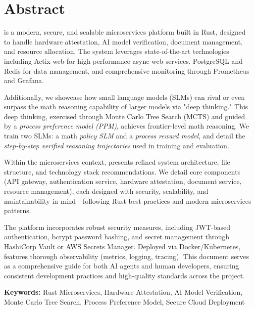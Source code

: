 \section*{Abstract}

\sysname{} is a modern, secure, and scalable microservices platform built in Rust, designed to handle hardware attestation, AI model verification, document management, and resource allocation. The system leverages state-of-the-art technologies including Actix-web for high-performance async web services, PostgreSQL and Redis for data management, and comprehensive monitoring through Prometheus and Grafana.

Additionally, we showcase how small language models (SLMs) can rival or even surpass the math reasoning capability of larger models via "deep thinking." This deep thinking, exercised through Monte Carlo Tree Search (MCTS) and guided by a \textit{process preference model (PPM)}, achieves frontier-level math reasoning. We train two SLMs: a math \emph{policy SLM} and a \emph{process reward model}, and detail the \textit{step-by-step verified reasoning trajectories} used in training and evaluation.

Within the microservices context, \sysname{} presents refined system architecture, file structure, and technology stack recommendations. We detail core components (API gateway, authentication service, hardware attestation, document service, resource management), each designed with security, scalability, and maintainability in mind—following Rust best practices and modern microservices patterns.

The platform incorporates robust security measures, including JWT-based authentication, bcrypt password hashing, and secret management through HashiCorp Vault or AWS Secrets Manager. Deployed via Docker/Kubernetes, \sysname{} features thorough observability (metrics, logging, tracing). This document serves as a comprehensive guide for both AI agents and human developers, ensuring consistent development practices and high-quality standards across the project.

\medskip
\noindent \textbf{Keywords:} Rust Microservices, Hardware Attestation, AI Model Verification, Monte Carlo Tree Search, Process Preference Model, Secure Cloud Deployment
